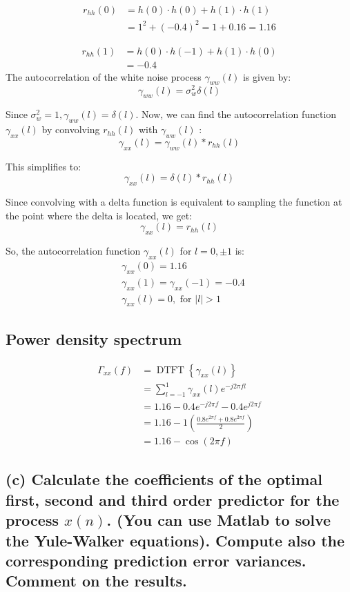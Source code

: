 $$
\begin{aligned}
    r_{hh}(0)&=h(0)\cdot h(0)+h(1)\cdot h(1)\\
    &=1^2+\left(-0.4\right)^2=1+0.16=1.16
\end{aligned}
$$

$$
\begin{aligned}
    r_{hh}(1)&=h(0)\cdot h(-1)+h(1)\cdot h(0)\\
    &= -0.4
\end{aligned}
$$
The autocorrelation of the white noise process $\gamma_{w w}(l)$ is given by:
$$
\gamma_{w w}(l)=\sigma_w^2 \delta(l)
$$

Since $\sigma_w^2=1, \gamma_{w w}(l)=\delta(l)$.
Now, we can find the autocorrelation function $\gamma_{x x}(l)$ by convolving $r_{h h}(l)$ with $\gamma_{w w}(l)$ :
$$
\gamma_{x x}(l)=\gamma_{w w}(l) * r_{h h}(l)
$$

This simplifies to:
$$
\gamma_{x x}(l)=\delta(l) * r_{h h}(l)
$$

Since convolving with a delta function is equivalent to sampling the function at the point where the delta is located, we get:
$$
\gamma_{x x}(l)=r_{h h}(l)
$$

So, the autocorrelation function $\gamma_{x x}(l)$ for $l=0, \pm 1$ is:
$$
\begin{aligned}
& \gamma_{x x}(0)=1.16 \\
& \gamma_{x x}(1)=\gamma_{x x}(-1)=-0.4 \\
& \gamma_{x x}(l)=0, \text { for }|l|>1
\end{aligned}
$$

\subsection*{Power density spectrum}
$$\begin{aligned}
    \Gamma_{x x}(f) & =\operatorname{DTFT}\left\{\gamma_{x x}(l)\right\}\\
    &= \sum_{l=-1}^{1} \gamma_{x x}(l) e^{-j2\pi f l}\\
    &=1.16-0.4e^{-j2\pi f}-0.4e^{j2\pi f}\\
    &=1.16-1\left(\frac{0.8e^{2\pi f}+0.8e^{2\pi f}}{2}\right)\\
    &=1.16-\cos (2\pi f)
\end{aligned}$$


\subsection*{(c) Calculate the coefficients of the optimal first, second and third order predictor for the process $x(n)$. (You can use Matlab to solve the Yule-Walker equations). Compute also the corresponding prediction error variances. Comment on the results.}

